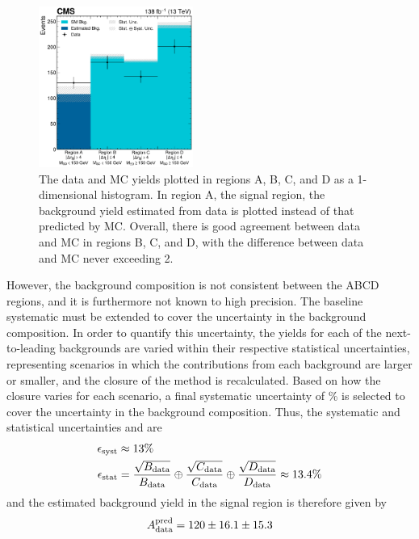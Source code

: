 \begin{figure}[htb]
    \centering
    \includegraphics[width=0.45\textwidth]{fig/vbswh/regionsABCD_closure_unblinded.pdf}
    \caption[The data and MC yields plotted in regions A, B, C, and D.]{
        The data and MC yields plotted in regions A, B, C, and D as a 1-dimensional histogram. 
        In region A, the signal region, the background yield estimated from data is plotted instead of that predicted by MC. 
        Overall, there is good agreement between data and MC in regions B, C, and D, with the difference between data and MC never exceeding 2\std. 
    }
    \label{fig:vbswh_abcd_closure}
\end{figure}
However, the background composition is not consistent between the ABCD regions, and it is furthermore not known to high precision. 
The baseline systematic must be extended to cover the uncertainty in the background composition. 
In order to quantify this uncertainty, the yields for each of the next-to-leading backgrounds are varied within their respective statistical uncertainties, representing scenarios in which the contributions from each background are larger or smaller, and the closure of the method is recalculated. 
Based on how the closure varies for each scenario, a final systematic uncertainty of \BkgEstTotalSystErr\% is selected to cover the uncertainty in the background composition. 
Thus, the systematic and statistical uncertainties \Esyst and \Estat are
\begin{align*}
    \epsilon_{\text{syst}} &\approx 13\% \\
    \epsilon_{\text{stat}} &= \frac{\sqrt{B_{\text{data}}}}{B_{\text{data}}} \oplus \frac{\sqrt{C_{\text{data}}}}{C_{\text{data}}} \oplus \frac{\sqrt{D_{\text{data}}}}{D_{\text{data}}} \approx 13.4\%
\end{align*}
and the estimated background yield in the signal region is therefore given by 
\begin{equation*}
    A_{\text{data}}^\text{pred} = 120 \pm 16.1 \pm 15.3
\end{equation*}
